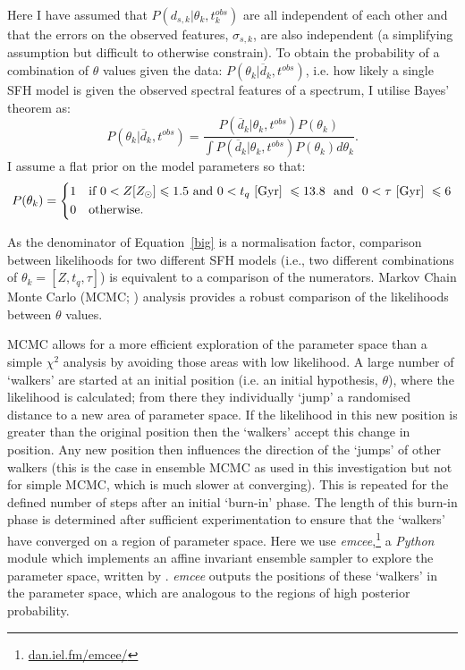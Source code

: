 \documentclass[useAMS,usenatbib]{mn2e}
\begin{document}
Here I have assumed that $P(d_{s, k}|\theta_k, t^{obs}_{k})$ are all independent of each other and that the errors on the observed features, $\sigma_{s, k}$, are also independent (a simplifying assumption but difficult to otherwise constrain). To obtain the probability of a combination of $\theta$ values given the data: $P(\theta_k|\overline{d}_k, t^{obs})$, i.e. how likely a single SFH model is  given the observed spectral features of a spectrum, I utilise Bayes' theorem as:
 \begin{equation}\label{big}
P(\theta_k|\overline{d}_k, t^{obs}) = \frac{P(\overline{d}_k|\theta_k, t^{obs})P(\theta_k)}{\int P(\overline{d}_k |\theta_k, t^{obs})P(\theta_k) d\theta_k}.
\end{equation}
I assume a flat prior on the model parameters so that:
\begin{equation}\label{prior}
P(\theta_k) =
\begin{dcases}
1 & \text{if } 0 < Z [Z_{\odot}] \leq 1.5 \text{ and } 0 < t_q ~\rm{[Gyr]}~ \leq 13.8 ~ \text{ and } ~ 0 < \tau  ~\rm{[Gyr]}~ \leq 6\\
0 & \text{otherwise.} \\
\end{dcases}
\end{equation}

As the denominator of Equation~\ref{big} is a normalisation factor, comparison between likelihoods for two different SFH models (i.e., two different combinations of $\theta_k = [Z, t_q, \tau]$) is equivalent to a comparison of the numerators. Markov Chain Monte Carlo (MCMC; \citealt{mackay03, emcee13, GW10}) analysis provides a robust comparison of the likelihoods between $\theta$ values.

MCMC allows for a more efficient exploration of the parameter space than a simple $\chi^2$ analysis by avoiding those areas with low likelihood. A large number of `walkers' are started at an initial position (i.e. an initial hypothesis, $\theta$), where the likelihood is calculated; from there they individually `jump' a randomised distance to a new area of parameter space. If the likelihood in this new position is greater than the original position then the `walkers' accept this change in position. Any new position then influences the direction of the  `jumps' of other walkers (this is the case in ensemble MCMC as used in this investigation but not for simple MCMC, which is much slower at converging). This is repeated for the defined number of steps after an initial `burn-in' phase. The length of this burn-in phase is determined after sufficient experimentation to ensure that the `walkers' have converged on a region of parameter space. Here we use \emph{emcee},\footnote{\url{dan.iel.fm/emcee/}} a \emph{Python} module which implements an affine invariant ensemble sampler to explore the parameter space, written by \cite{emcee13}. \emph{emcee} outputs the positions of these `walkers' in the parameter space, which are analogous to the regions of high posterior probability. 
\end{document}
